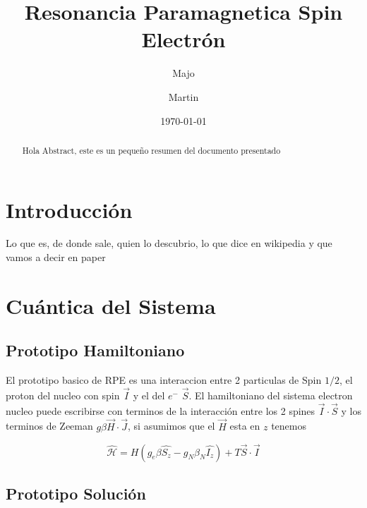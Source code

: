 \documentclass[twocolumn,
amssymb,prb,aps,superscriptaddress]{revtex4}
\begin{document}
\begin{abstract}
    Hola Abstract, este es un pequeño resumen del documento presentado
\end{abstract}

\title{Resonancia Paramagnetica Spin Electrón}
\author{Majo}


\author{Martin}


\date{\today}

\maketitle

\section[Intro]{Introducción}
\label{sec:intro}

Lo que es, de donde sale, quien lo descubrio, lo que dice en wikipedia y que vamos a decir en paper

\section[]{Cuántica del Sistema}
\label{sec:cuantica}

\subsection{Prototipo Hamiltoniano}

El prototipo basico de RPE es una interaccion entre 2 particulas de Spin $1/2$, el proton del nucleo con spin $\vec{I}$ y el del $e^-$ $\vec{S}$. El hamiltoniano del sistema electron nucleo puede escribirse con terminos de la interacción entre los 2 spines $ \vec{I} \cdot \vec{S} $ y los terminos de Zeeman $g \beta \vec{H} \cdot \vec{J}$, si asumimos que el $\vec{H}$ esta en $z$ tenemos

\begin{equation}
    \label{eq:hamiltonianoDelSistema}
    \mathcal{\hat{H}} = H (g_e \beta \hat{S_z} - g_N \beta_N \hat{I_z}) + T \vec{S} \cdot \vec{I} 
\end{equation}

\subsection{Prototipo Solución}
\end{document}

